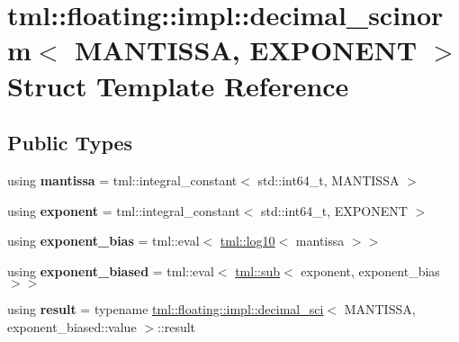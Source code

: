 \hypertarget{structtml_1_1floating_1_1impl_1_1decimal__scinorm}{\section{tml\+:\+:floating\+:\+:impl\+:\+:decimal\+\_\+scinorm$<$ M\+A\+N\+T\+I\+S\+S\+A, E\+X\+P\+O\+N\+E\+N\+T $>$ Struct Template Reference}
\label{structtml_1_1floating_1_1impl_1_1decimal__scinorm}
}
\subsection*{Public Types}
\begin{DoxyCompactItemize}
\item 
\hypertarget{structtml_1_1floating_1_1impl_1_1decimal__scinorm_a43b2abaea5ea0479eda2b942c8bf1ec8}{using {\bfseries mantissa} = tml\+::integral\+\_\+constant$<$ std\+::int64\+\_\+t, M\+A\+N\+T\+I\+S\+S\+A $>$}\label{structtml_1_1floating_1_1impl_1_1decimal__scinorm_a43b2abaea5ea0479eda2b942c8bf1ec8}

\item 
\hypertarget{structtml_1_1floating_1_1impl_1_1decimal__scinorm_ac8a1326c795a866dfc4bf527764b4558}{using {\bfseries exponent} = tml\+::integral\+\_\+constant$<$ std\+::int64\+\_\+t, E\+X\+P\+O\+N\+E\+N\+T $>$}\label{structtml_1_1floating_1_1impl_1_1decimal__scinorm_ac8a1326c795a866dfc4bf527764b4558}

\item 
\hypertarget{structtml_1_1floating_1_1impl_1_1decimal__scinorm_aae5e4b1eadec2dd82c9b692ad98eb03d}{using {\bfseries exponent\+\_\+bias} = tml\+::eval$<$ \hyperlink{structtml_1_1log10}{tml\+::log10}$<$ mantissa $>$$>$}\label{structtml_1_1floating_1_1impl_1_1decimal__scinorm_aae5e4b1eadec2dd82c9b692ad98eb03d}

\item 
\hypertarget{structtml_1_1floating_1_1impl_1_1decimal__scinorm_a9efd73be4a41eac814063fbb9a02aa52}{using {\bfseries exponent\+\_\+biased} = tml\+::eval$<$ \hyperlink{structtml_1_1sub}{tml\+::sub}$<$ exponent, exponent\+\_\+bias $>$$>$}\label{structtml_1_1floating_1_1impl_1_1decimal__scinorm_a9efd73be4a41eac814063fbb9a02aa52}

\item 
\hypertarget{structtml_1_1floating_1_1impl_1_1decimal__scinorm_a999660668c33740e69c9a14b1f7d79d3}{using {\bfseries result} = typename \hyperlink{structtml_1_1floating_1_1impl_1_1decimal__sci}{tml\+::floating\+::impl\+::decimal\+\_\+sci}$<$ M\+A\+N\+T\+I\+S\+S\+A, exponent\+\_\+biased\+::value $>$\+::result}\label{structtml_1_1floating_1_1impl_1_1decimal__scinorm_a999660668c33740e69c9a14b1f7d79d3}

\end{DoxyCompactItemize}


